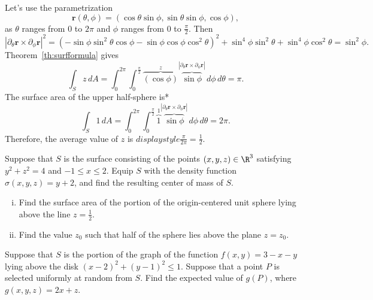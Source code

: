 \documentclass[indent]{watsonbook}
\begin{document}
\begin{solution}
  Let's use the parametrization
  \[
    \mathbf{r}(\theta,\phi) =
    (\cos\theta\sin\phi,\sin\theta\sin\phi,\cos\phi),
  \]
  as $\theta$ ranges from 0 to $2\pi$ and $\phi$ ranges from $0$ to
  $\frac{\pi}{2}$. Then
  \[
    |\partial_\theta\mathbf{r} \times     \partial_\phi\mathbf{r} |^2=
    \left(- \sin{\phi} \sin^{2}{\theta
      } \cos{\phi} - \sin{\phi}
      \cos{\phi} \cos^{2}{\theta}\right)^{2} + \sin^{4}{\phi} \sin^{2}{\theta } + \sin^{4}{\phi}
    \cos^{2}{\theta } = \sin^2\phi.
  \]
  Theorem~\ref{th:surfformula} gives
  \[
    \int_S z \, {d}{A} = \int_{0}^{2\pi} \int_{0}^{\frac{\pi}{2}}
    \overbrace{(\cos\phi)}^{z} \overbrace{\sin\phi}^{|\partial_\theta
      \mathbf{r}\times \partial_\phi \mathbf{r}|} \, {d} \phi \, {d}
    \theta = \pi.
  \]
  The surface area of the upper half-sphere is* 
  \[
    \int_S 1 \, {d}{A} = \int_{0}^{2\pi} \int_{0}^{\frac{\pi}{2}}
    \overbrace{1}^{1} \overbrace{\sin\phi}^{|\partial_\theta
      \mathbf{r}\times \partial_\phi \mathbf{r}|} \, {d} \phi \, {d}
    \theta = 2\pi.
  \]
  Therefore, the average value of $z$ is
  ${d}isplaystyle{\frac{\pi}{2\pi}} = \boxed{\frac{1}{2}}$.
\end{solution}

\begin{exercise}{}{}
  Suppose that $S$ is the surface consisting of the points
  $(x,y,z) \in \R^3$ satisfying $y^2 + z^2 = 4$ and
  $-1 \leq x \leq 2$. Equip $S$ with the density function
  $\sigma(x,y,z) = y + 2$, and find the resulting center of mass of
  $S$.
\end{exercise}

\begin{exercise}{}{}
  \begin{enumerate}[(i),leftmargin=12pt]
  \item Find the surface area of the portion of the origin-centered
    unit sphere lying above the line $z = \frac{1}{2}$.
  \item Find the value $z_0$ such that half of the sphere lies above the
    plane $z = z_0$.
  \end{enumerate}
\end{exercise}

\begin{exercise}{}{}
  Suppose that $S$ is the portion of the graph of the function
  $f(x,y) = 3 - x - y$ lying above the disk
  $(x-2)^2 + (y-1)^2 \leq 1$. Suppose that a point $P$ is selected
  uniformly at random from $S$. Find the expected value of $g(P)$,
  where $g(x,y,z) = 2x + z$.
\end{exercise}
\end{document}
